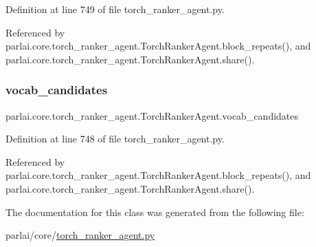 Definition at line 749 of file torch\+\_\+ranker\+\_\+agent.\+py.



Referenced by parlai.\+core.\+torch\+\_\+ranker\+\_\+agent.\+Torch\+Ranker\+Agent.\+block\+\_\+repeats(), and parlai.\+core.\+torch\+\_\+ranker\+\_\+agent.\+Torch\+Ranker\+Agent.\+share().

\mbox{\label{classparlai_1_1core_1_1torch__ranker__agent_1_1TorchRankerAgent_a627d68f27f1e2683935674b632c7c3e1}} 
\subsubsection{\texorpdfstring{vocab\+\_\+candidates}{vocab\_candidates}}
{\footnotesize\ttfamily parlai.\+core.\+torch\+\_\+ranker\+\_\+agent.\+Torch\+Ranker\+Agent.\+vocab\+\_\+candidates}



Definition at line 748 of file torch\+\_\+ranker\+\_\+agent.\+py.



Referenced by parlai.\+core.\+torch\+\_\+ranker\+\_\+agent.\+Torch\+Ranker\+Agent.\+block\+\_\+repeats(), and parlai.\+core.\+torch\+\_\+ranker\+\_\+agent.\+Torch\+Ranker\+Agent.\+share().



The documentation for this class was generated from the following file\+:\begin{DoxyCompactItemize}
\item 
parlai/core/\hyperlink{torch__ranker__agent_8py}{torch\+\_\+ranker\+\_\+agent.\+py}\end{DoxyCompactItemize}
